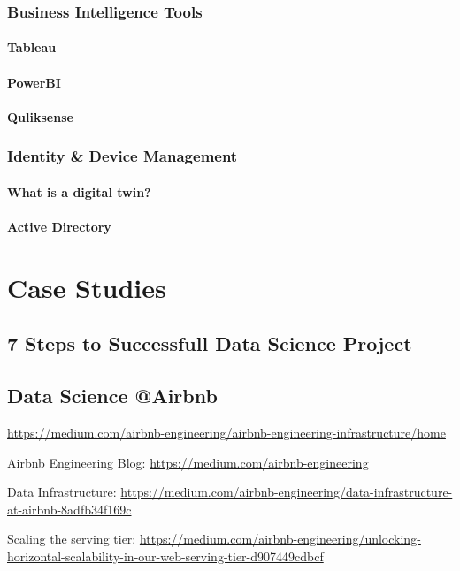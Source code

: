 \documentclass[12pt]{scrartcl} %
\begin{document}
\subsubsection{Business Intelligence Tools}
\paragraph{Tableau}
\paragraph{PowerBI}
\paragraph{Quliksense}

\subsubsection{Identity \& Device Management}

\paragraph{What is a digital twin?}
\paragraph{Active Directory}


\section{Case Studies}
\subsection{7 Steps to Successfull Data Science Project}
\subsection{Data Science @Airbnb}
\url{https://medium.com/airbnb-engineering/airbnb-engineering-infrastructure/home}

Airbnb Engineering Blog:
\url{https://medium.com/airbnb-engineering}

Data Infrastructure:
\url{https://medium.com/airbnb-engineering/data-infrastructure-at-airbnb-8adfb34f169c}

Scaling the serving tier:
\url{https://medium.com/airbnb-engineering/unlocking-horizontal-scalability-in-our-web-serving-tier-d907449cdbcf}
\end{document}
